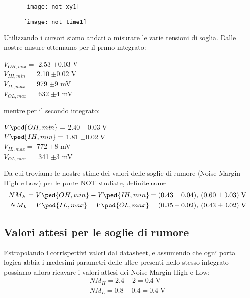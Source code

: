 \documentclass[10pt, a4paper, italian]{article}
\begin{document}
\begin{figure}[htbp]
\centering
	\texttt{[image: not\_xy1]}
\end{figure}
\begin{figure}[htbp]
\centering
	\texttt{[image: not\_time1]}
\end{figure}

Utilizzando i cursori siamo andati a misurare le varie tensioni di soglia.
Dalle nostre misure otteniamo per il primo integrato:
\begin{multicols}{2}
    \centering
    $V_{OH,min}=$ 2.53 $\pm$0.03 V\\
    $V_{IH,min}=$ 2.10 $\pm$0.02 V\\
    
    $V_{IL,max}=$ 979 $\pm$9 mV\\
    $V_{OL,max}=$ 632 $\pm$4 mV\\
\end{multicols}
mentre per il secondo integrato:

\begin{multicols}{2}
    \centering
    $V\ped{OH, min}=$ 2.40 $\pm$0.03 V\\
    $V\ped{IH, min}=$ 1.81 $\pm$0.02 V\\
    
    $V_{IL,max}=$ 772 $\pm$8 mV\\
    $V_{OL,max}=$ 341 $\pm$3 mV\\
\end{multicols}

Da cui troviamo le nostre stime dei valori delle soglie di rumore (Noise
Margin High e Low) per le porte NOT studiate, definite come
\begin{align*}
    NM_H = V\ped{OH, min} - V\ped{IH, min} = (0.43 \pm 0.04), \;
    (0.60 \pm 0.03) \; \si{\V} \\
    NM_L = V\ped{IL, max} - V\ped{OL, max} = (0.35 \pm 0.02), \;
    (0.43 \pm 0.02) \; \si{\V}
\end{align*}

\subsection{Valori attesi per le soglie di rumore}
Estrapolando i corrispettivi valori dal datasheet, e assumendo che ogni porta
logica abbia i medesimi parametri delle altre presenti nello stesso integrato
possiamo allora ricavare i valori attesi dei Noise Margin High e Low:
\begin{align*}
NM_H = 2.4 - 2 = 0.4 \; \si{\V} \\
NM_L = 0.8 - 0.4 = 0.4 \; \si{\V}
\end{align*}
\end{document}
